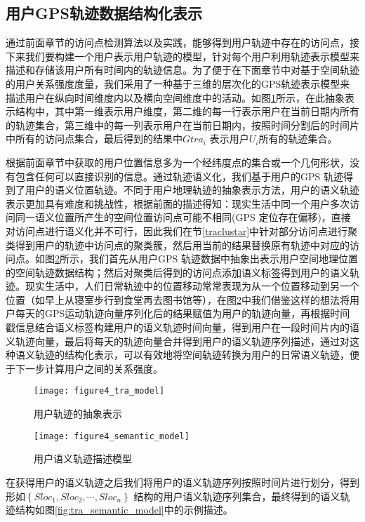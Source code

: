 \subsection{用户GPS轨迹数据结构化表示}
\label{sec:section3-4}
通过前面章节的访问点检测算法以及实践，能够得到用户轨迹中存在的访问点，接下来我们要构建一个用户表示用户轨迹的模型，针对每个用户利用轨迹表示模型来描述和存储该用户所有时间内的轨迹信息。为了便于在下面章节中对基于空间轨迹的用户关系强度度量，我们采用了一种基于三维的层次化的GPS轨迹表示模型来描述用户在纵向时间维度内以及横向空间维度中的活动。如图\ref{fig:tramodel_abstract}所示，在此抽象表示结构中，其中第一维表示用户维度，第二维的每一行表示用户在当前日期内所有的轨迹集合，第三维中的每一列表示用户在当前日期内，按照时间分割后的时间片中所有的访问点集合，最后得到的结果中$Gtra_{i}$ 表示用户$U_{i}$所有的轨迹集合。
\par 根据前面章节中获取的用户位置信息多为一个经纬度点的集合或一个几何形状，没有包含任何可以直接识别的信息。通过轨迹语义化，我们基于用户的GPS 轨迹得到了用户的语义位置轨迹。不同于用户地理轨迹的抽象表示方法，用户的语义轨迹表示更加具有难度和挑战性，根据前面的描述得知：现实生活中同一个用户多次访问同一语义位置所产生的空间位置访问点可能不相同(GPS 定位存在偏移)，直接对访问点进行语义化并不可行，因此我们在节\ref{traclustar}中针对部分访问点进行聚类得到用户的轨迹中访问点的聚类簇，然后用当前的结果替换原有轨迹中对应的访问点。如图\ref{fig:semantic_model}所示，我们首先从用户GPS 轨迹数据中抽象出表示用户空间地理位置的空间轨迹数据结构；然后对聚类后得到的访问点添加语义标签得到用户的语义轨迹。现实生活中，人们日常轨迹中的位置移动常常表现为从一个位置移动到另一个位置（如早上从寝室步行到食堂再去图书馆等），在图\ref{fig:semantic_model}中我们借鉴这样的想法将用户每天的GPS运动轨迹向量序列化后的结果赋值为用户的轨迹向量，再根据时间戳信息结合语义标签构建用户的语义轨迹时间向量，得到用户在一段时间片内的语义轨迹向量，最后将每天的轨迹向量合并得到用户的语义轨迹序列描述，通过对这种语义轨迹的结构化表示，可以有效地将空间轨迹转换为用户的日常语义轨迹，便于下一步计算用户之间的关系强度。
\begin{figure}[htp]
\centering
\texttt{[image: figure4\_tra\_model]}
\caption{用户轨迹的抽象表示}
\label{fig:tramodel_abstract}
\end{figure}
\begin{figure}[htp]
\centering
\texttt{[image: figure4\_semantic\_model]}
\caption{用户语义轨迹描述模型}
\label{fig:semantic_model}
\end{figure}
\par 在获得用户的语义轨迹之后我们将用户的语义轨迹序列按照时间片进行划分，得到形如$\left \{Sloc_{1},Sloc_{2},\cdots ,Sloc_{n} \right \}$ 结构的用户语义轨迹序列集合，最终得到的语义轨迹结构如图\ref{fig:tra_semantic_model}中的示例描述。

